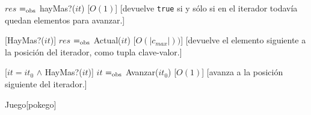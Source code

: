 \begin{Interfaz}
	{$res$ $=_{\mathrm{obs}}$ hayMas?($it$)}
	[$O(1)$]
	[devuelve \texttt{true} si y sólo si en el iterador todavía quedan elementos para avanzar.]

	[HayMas?($it$)]
	{$res$ $=_{\mathrm{obs}}$ Actual($it$)}
	[$O(|c_{max}|))$]
	[devuelve el elemento siguiente a la posición del iterador, como tupla clave-valor.]

	[$it = it_0$ $\land$ HayMas?($it$)]
	{$it$ $=_{\mathrm{obs}}$ Avanzar($it_0$)}
	[$O(1)$]
	[avanza a la posición siguiente del iterador.]

\end{Interfaz}

\begin{Representacion}


	\begin{Estructura}{Juego}[pokego]
		\begin{Tupla}[pokego]
		\end{Tupla}

		\begin{Tupla}[infoJugador]
		\end{Tupla}

		\begin{Tupla}[infoPos]
		\end{Tupla}

	\end{Estructura}
	

	\begin{enumerate}
		

\end{enumerate}
\end{Representacion}
